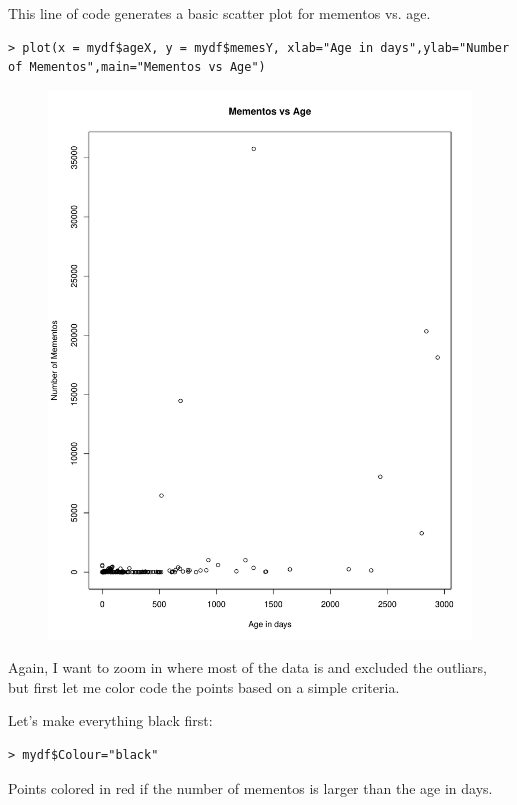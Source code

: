 \documentclass[a4paper, 11pt]{article}
\begin{document}
This line of code generates a basic scatter plot for mementos vs. age.
\begin{lstlisting}
> plot(x = mydf$ageX, y = mydf$memesY, xlab="Age in days",ylab="Number of Mementos",main="Mementos vs Age")
\end{lstlisting}

\begin{figure}[H]
\centering
\includegraphics[scale=0.7]{splot1.pdf}
\end{figure}
\pagebreak

Again, I want to zoom in where most of the data is and excluded the outliars, but first let me color code the points based on a simple criteria.

Let's make everything black first:

\begin{lstlisting}
> mydf$Colour="black"
\end{lstlisting}

Points colored in red if the number of mementos is larger than the age in days.
\end{document}
